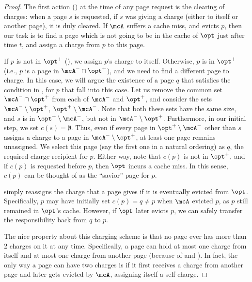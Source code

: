 \begin{proof}
    The first action () at the time of any page request is the clearing of charges: when a page $s$ is requested, if $s$ was giving a charge (either to itself or another page), it is duly cleared. If $\mcA$ suffers a cache miss, and evicts $p$, then our task is to find a page which is not going to be in the cache of $\opt$ just after time $t$, and assign a charge from $p$ to this page.
    
    If $p$ is not in $\opt^+$ (), we assign $p$'s charge to itself. Otherwise, $p$ is in $\opt^+$ (i.e., $p$ is a page in $\mcA^- \cap \opt^+$), and we need to find a different page to charge. In this case, we will argue the existence of a page $q$ that satisfies the condition in , for $p$ that fall into this case. Let us remove the common set $\mcA^- \cap \opt^+$ from each of $\mcA^-$ and $\opt^+$, and consider the sets $\mcA^- \setminus \opt^+$, $\opt^+ \setminus \mcA^-$. Note that both these sets have the same size, and $s$ is in $\opt^+ \setminus \mcA^-$, but not in $\mcA^- \setminus \opt^+$. Furthermore, in our initial step, we set $c(s)=\emptyset$. Thus, even if every page in $\opt^+ \setminus \mcA^-$ other than $s$ assigns a charge to a page in $\mcA^- \setminus \opt^+$, at least one page remains unassigned.
    We select this page (say the first one in a natural ordering) as $q$, the required charge recipient for $p$. Either way, note that $c(p)$ is not in $\opt^+$, and if $c(p)$ is requested before $p$, then $\opt$ incurs a cache miss. In this sense, $c(p)$ can be thought of as the “savior” page for $p$. %
    
     simply reassigns the charge that a page gives if it is eventually evicted from $\opt$. 
    Specifically, $p$ may have initially set $c(p) = q \neq p$ when $\mcA$ evicted $p$, as $p$ still remained in $\opt$'s cache. However, if $\opt$ later evicts $p$, we can safely transfer the responsibility back from $q$ to $p$.
    

    The nice property about this charging scheme is that no page ever has more than $2$ charges on it at any time. Specifically, a page can hold at most one charge from itself and at most one charge from another page (because of  and ). 
    In fact, the only way a page can have two charges is if it first receives a charge from another page and later gets evicted by $\mcA$, assigning itself a self-charge.


\end{proof}
